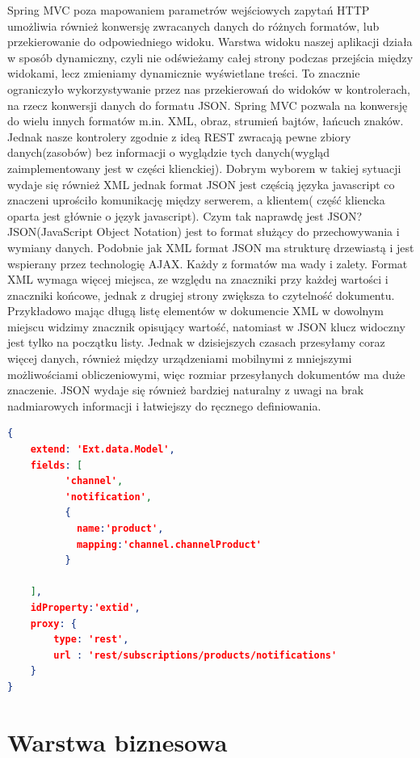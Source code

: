 Spring MVC poza mapowaniem parametrów wejściowych zapytań HTTP umożliwia również konwersję zwracanych danych do różnych formatów, lub przekierowanie do odpowiedniego widoku. Warstwa widoku naszej aplikacji działa w sposób dynamiczny, czyli nie odświeżamy całej strony podczas przejścia między widokami, lecz zmieniamy dynamicznie wyświetlane treści. To znacznie ograniczyło wykorzystywanie przez nas przekierowań do widoków w kontrolerach, na rzecz konwersji danych do formatu JSON. Spring MVC pozwala na konwersję do wielu innych formatów m.in. XML, obraz, strumień bajtów, łańcuch znaków. Jednak nasze kontrolery zgodnie z ideą REST zwracają pewne zbiory danych(zasobów) bez informacji o wyglądzie tych danych(wygląd zaimplementowany jest w części klienckiej). Dobrym wyborem w takiej sytuacji wydaje się również XML jednak format JSON jest częścią języka javascript co znaczeni uprościło komunikację między serwerem, a klientem( część kliencka oparta jest głównie o język javascript).
Czym tak naprawdę jest JSON? JSON(JavaScript Object Notation) jest to format służący do przechowywania i wymiany danych. Podobnie jak XML format JSON ma strukturę drzewiastą i jest wspierany przez technologię AJAX. Każdy z formatów ma wady i zalety. Format XML wymaga więcej miejsca, ze względu na znaczniki przy każdej wartości i znaczniki końcowe, jednak z drugiej strony zwiększa to czytelność dokumentu. Przykładowo mając długą listę elementów w dokumencie XML w dowolnym miejscu widzimy znacznik opisujący wartość, natomiast w JSON klucz widoczny jest tylko na początku listy. Jednak w dzisiejszych czasach przesyłamy coraz więcej danych, również między urządzeniami mobilnymi z mniejszymi możliwościami obliczeniowymi, więc rozmiar przesyłanych dokumentów ma duże znaczenie. JSON wydaje się również bardziej naturalny z uwagi na brak nadmiarowych informacji i łatwiejszy do ręcznego definiowania. 

\begin{lstlisting}[language=json,caption=Przykład użycia formatu JSON]
{
    extend: 'Ext.data.Model',
    fields: [
          'channel',
          'notification',
          {
          	name:'product',
          	mapping:'channel.channelProduct'
          }
         
    ],
    idProperty:'extid',
    proxy: {
        type: 'rest',
        url : 'rest/subscriptions/products/notifications'
    }
}
\end{lstlisting}


\section{Warstwa biznesowa}

